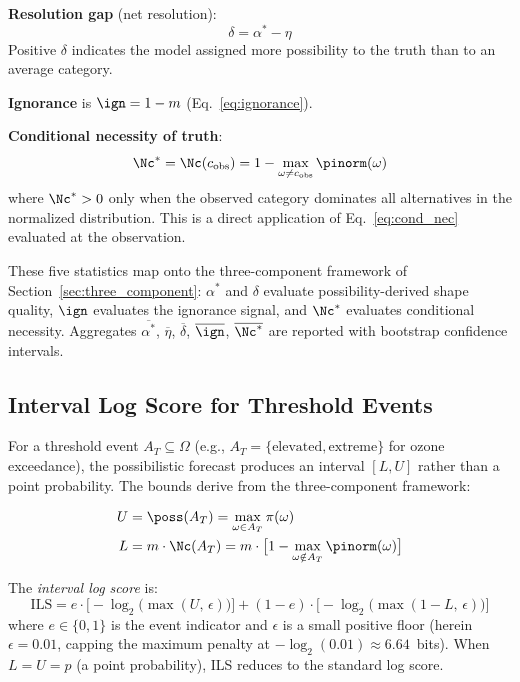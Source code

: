 \textbf{Resolution gap} (net resolution):
\begin{equation}
\delta = \alpha^* - \eta \label{eq:rg}
\end{equation}
Positive $\delta$ indicates the model assigned more possibility to the truth than to an average category.

\textbf{Ignorance} is $\ign = 1 - m$ (Eq.~\eqref{eq:ignorance}).

\textbf{Conditional necessity of truth}:
\begin{equation}
\Nc^* = \Nc(c_{\mathrm{obs}}) = 1 - \max_{\omega \neq c_{\mathrm{obs}}} \pinorm(\omega) \label{eq:nc_star}
\end{equation}
where $\Nc^* > 0$ only when the observed category dominates all alternatives in the normalized distribution. This is a direct application of Eq.~\eqref{eq:cond_nec} evaluated at the observation.

These five statistics map onto the three-component framework of Section~\ref{sec:three_component}: $\alpha^*$ and $\delta$ evaluate possibility-derived shape quality, $\ign$ evaluates the ignorance signal, and $\Nc^*$ evaluates conditional necessity. Aggregates $\overline{\alpha^*}$, $\overline{\eta}$, $\overline{\delta}$, $\overline{\ign}$, $\overline{\Nc^*}$ are reported with bootstrap confidence intervals.

\subsection{Interval Log Score for Threshold Events}\label{sec:interval_log}

For a threshold event $A_T \subseteq \Omega$ (e.g., $A_T = \{\text{elevated}, \text{extreme}\}$ for ozone exceedance), the possibilistic forecast produces an interval $[L, U]$ rather than a point probability. The bounds derive from the three-component framework:

\begin{align}
U &= \poss(A_T) = \max_{\omega \in A_T} \pi(\omega) \label{eq:U_bound} \\
L &= m \cdot \Nc(A_T) = m \cdot \bigl[1 - \max_{\omega \notin A_T} \pinorm(\omega)\bigr] \label{eq:L_bound}
\end{align}

The \textit{interval log score} is:
\begin{equation}
\mathrm{ILS} = e \cdot \bigl[-\log_2\bigl(\max(U,\, \epsilon)\bigr)\bigr] + (1 - e) \cdot \bigl[-\log_2\bigl(\max(1 - L,\, \epsilon)\bigr)\bigr] \label{eq:interval_log}
\end{equation}
where $e \in \{0, 1\}$ is the event indicator and $\epsilon$ is a small positive floor (herein $\epsilon = 0.01$, capping the maximum penalty at $-\log_2(0.01) \approx 6.64$~bits). When $L = U = p$ (a point probability), ILS reduces to the standard log score.

